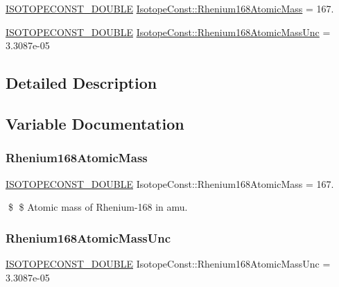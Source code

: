 \begin{DoxyCompactItemize}
\item 
\mbox{\hyperlink{group___isotope_const-_macros_ga8f45a7272ce02c0b4c65c44636ed719a}{I\+S\+O\+T\+O\+P\+E\+C\+O\+N\+S\+T\+\_\+\+D\+O\+U\+B\+LE}} \mbox{\hyperlink{group___isotope_const-_rhenium-_re168_ga58ac02e88c60fc8f9bf801a9fcdc8996}{Isotope\+Const\+::\+Rhenium168\+Atomic\+Mass}} = 167.
\item 
\mbox{\hyperlink{group___isotope_const-_macros_ga8f45a7272ce02c0b4c65c44636ed719a}{I\+S\+O\+T\+O\+P\+E\+C\+O\+N\+S\+T\+\_\+\+D\+O\+U\+B\+LE}} \mbox{\hyperlink{group___isotope_const-_rhenium-_re168_gaae8bebdc28a6c202c0ca1f929f675488}{Isotope\+Const\+::\+Rhenium168\+Atomic\+Mass\+Unc}} = 3.\+3087e-\/05
\end{DoxyCompactItemize}


\subsection{Detailed Description}


\subsection{Variable Documentation}
\mbox{\label{group___isotope_const-_rhenium-_re168_ga58ac02e88c60fc8f9bf801a9fcdc8996}} 
\subsubsection{\texorpdfstring{Rhenium168\+Atomic\+Mass}{Rhenium168AtomicMass}}
{\footnotesize\ttfamily \mbox{\hyperlink{group___isotope_const-_macros_ga8f45a7272ce02c0b4c65c44636ed719a}{I\+S\+O\+T\+O\+P\+E\+C\+O\+N\+S\+T\+\_\+\+D\+O\+U\+B\+LE}} Isotope\+Const\+::\+Rhenium168\+Atomic\+Mass = 167.}

\$ \$ Atomic mass of Rhenium-\/168 in amu. \mbox{\label{group___isotope_const-_rhenium-_re168_gaae8bebdc28a6c202c0ca1f929f675488}} 
\subsubsection{\texorpdfstring{Rhenium168\+Atomic\+Mass\+Unc}{Rhenium168AtomicMassUnc}}
{\footnotesize\ttfamily \mbox{\hyperlink{group___isotope_const-_macros_ga8f45a7272ce02c0b4c65c44636ed719a}{I\+S\+O\+T\+O\+P\+E\+C\+O\+N\+S\+T\+\_\+\+D\+O\+U\+B\+LE}} Isotope\+Const\+::\+Rhenium168\+Atomic\+Mass\+Unc = 3.\+3087e-\/05}


